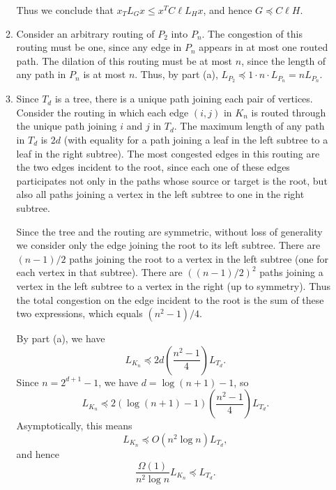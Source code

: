 \documentclass{article}
\newcommand{\1}{\mathbf{1}}
\newcommand{\0}{\mathbf{0}}
\begin{document}
\begin{enumerate}
\begin{enumerate}
    Thus we conclude that $x_T L_G x \leq x^T C \ell L_H x$, and hence $G \preceq C \ell H$.
  \item
    Consider an arbitrary routing of $P_2$ into $P_n$.
    The congestion of this routing must be one, since any edge in $P_n$ appears in at most one routed path.
    The dilation of this routing must be at most $n$, since the length of any path in $P_n$ is at most $n$.
    Thus, by part (a), $L_{P_2} \preceq 1 \cdot n \cdot L_{P_n} = n L_{P_n}$.
  \item
    Since $T_d$ is a tree, there is a unique path joining each pair of vertices.
    Consider the routing in which each edge $(i, j)$ in $K_n$ is routed through the unique path joining $i$ and $j$ in $T_d$.
    The maximum length of any path in $T_d$ is $2d$ (with equality for a path joining a leaf in the left subtree to a leaf in the right subtree).
    The most congested edges in this routing are the two edges incident to the root, since each one of these edges participates not only in the paths whose source or target is the root, but also all paths joining a vertex in the left subtree to one in the right subtree.

    Since the tree and the routing are symmetric, without loss of generality we consider only the edge joining the root to its left subtree.
    There are $(n - 1) / 2$ paths joining the root to a vertex in the left subtree (one for each vertex in that subtree).
    There are $((n - 1) / 2)^2$ paths joining a vertex in the left subtree to a vertex in the right (up to symmetry).
    Thus the total congestion on the edge incident to the root is the sum of these two expressions, which equals $(n^2 - 1) / 4$.

    By part (a), we have
    \begin{equation*}
      L_{K_n} \preceq 2d \left(\frac{n^2 - 1}{4}\right) L_{T_d}.
    \end{equation*}
    Since $n = 2^{d + 1} - 1$, we have $d = \log(n + 1) - 1$, so
    \begin{equation*}
      L_{K_n} \preceq 2 (\log(n + 1) - 1) \left(\frac{n^2 - 1}{4}\right) L_{T_d}.
    \end{equation*}
    Asymptotically, this means
    \begin{equation*}
      L_{K_n} \preceq O(n^2 \log n) L_{T_d},
    \end{equation*}
    and hence
    \begin{equation*}
      \frac{\Omega(1)}{n^2 \log n} L_{K_n} \preceq L_{T_d}.
    \end{equation*}


\end{enumerate}
\end{enumerate}
\end{document}
